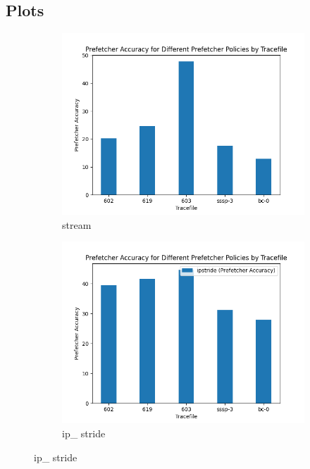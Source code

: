 \documentclass{article}
\begin{document}
\subsection{Plots}
\begin{figure}[h!]

\centering
\begin{subfigure}{0.5\textwidth}
  \centering
  \includegraphics[width=\linewidth]{stream_accuracy.png}
  \caption{stream}
  \label{1a}
\end{subfigure}%
\begin{subfigure}{0.5\textwidth}
  \centering
  \includegraphics[width=\linewidth]{ip_accuracy.png}
  \caption{ip\_ stride}
  \label{1b}
\end{subfigure}

\end{figure}
\end{document}
